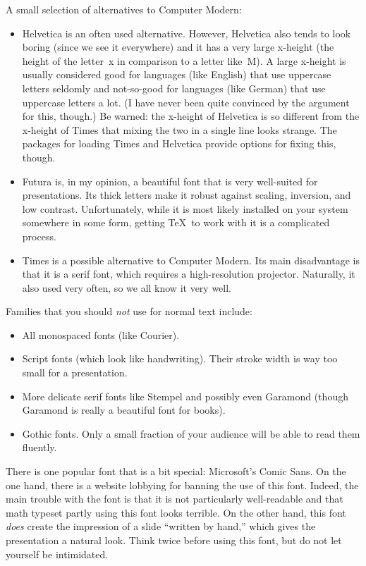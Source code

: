 A small selection of alternatives to Computer Modern:
\begin{itemize}
\item
  Helvetica is an often used alternative. However, Helvetica also
  tends to look boring (since we see it everywhere) and it has a very
  large x-height (the height of the letter~x in comparison to a letter
  like~M). A large x-height is usually considered good for languages
  (like English) that use uppercase letters seldomly and not-so-good
  for languages (like German) that use uppercase letters a lot. (I
  have never been quite convinced by the argument for this, though.)
  Be warned: the x-height of Helvetica is so different from the
  x-height of Times that mixing the two in a single line looks
  strange. The packages for loading Times and Helvetica provide
  options for fixing this, though.
\item
  Futura is, in my opinion, a beautiful font that is very well-suited
  for presentations. Its thick letters make it robust against
  scaling, inversion, and low contrast. Unfortunately, while it is
  most likely installed on your system somewhere in some form, getting
  \TeX\ to work with it is a complicated process.
\item
  Times is a possible alternative to Computer Modern. Its main
  disadvantage is that it is a serif font, which requires a
  high-resolution projector. Naturally, it also used very often, so we
  all know it very well.
\end{itemize}

Families that you should \emph{not} use for normal text include:
\begin{itemize}
\item
  All monospaced fonts (like Courier).
\item
  Script fonts (which look like handwriting). Their stroke width is
  way too small for a presentation.
\item
  More delicate serif fonts like Stempel and possibly even Garamond
  (though Garamond is really a beautiful font for books).
\item
  Gothic fonts. Only a small fraction of your audience will be able to
  read them fluently. 
\end{itemize}

There is one popular font that is a bit special: Microsoft's Comic
Sans. On the one hand, there is a website lobbying for banning the use
of this font. Indeed, the main trouble with the font is that it is not
particularly well-readable and that math typeset partly using this
font looks terrible. On the other hand, this font \emph{does} create
the impression of a slide ``written by hand,'' which gives the
presentation a natural look. Think twice before using this font, but
do not let yourself be intimidated.

